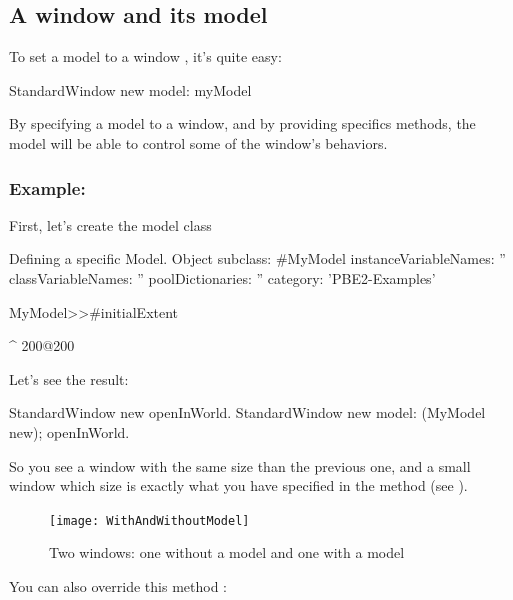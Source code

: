 \documentclass[a4paper,10pt,twoside]{book}
\begin{document}
\subsection{A window and its model}

To set a model to a window , it's quite easy:

\begin{code}{}
StandardWindow new model: myModel
\end{code}

By specifying a model to a window, and by providing specifics methods, the model will be able to control some of the window's behaviors.

\subsubsection{Example:}

First, let's create the model class

\begin{classdef}{Defining a specific Model.}
Object subclass: #MyModel
	instanceVariableNames: ''
	classVariableNames: ''
	poolDictionaries: ''
	category: 'PBE2-Examples'

MyModel>>#initialExtent

	^ 200@200
\end{classdef}

Let's see the result:

\begin{code}{}
StandardWindow new openInWorld.
StandardWindow new model: (MyModel new); openInWorld.
\end{code}

So you see a window with the same size than the previous one, and a small window which size is exactly what you have specified in the method  (see ).

\begin{figure}[ht]
\begin{center}
	\texttt{[image: WithAndWithoutModel]}
	\caption{Two windows: one without a model and one with a model}
\end{center}
\end{figure}
You can also override this method :
\end{document}
